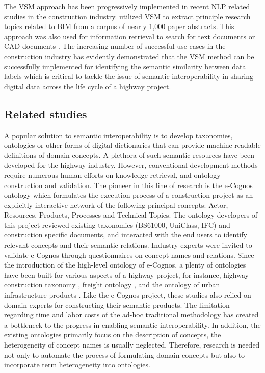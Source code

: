\documentclass[Journal, BackFigs,NoLists, DoubleSpace]{ascelike}%
\begin{document}
\par
The VSM approach has been progressively implemented in recent NLP related studies in the construction industry.  utilized VSM to extract principle research topics related to BIM from a corpus of nearly 1,000 paper abstracts. This approach was also used for information retrieval to search for text documents \cite{lv15} or CAD documents \cite{hsu13}. The increasing number of successful use cases in the construction industry has evidently demonstrated that the VSM method can be successfully implemented for identifying the semantic similarity between data labels which is critical to tackle the issue of semantic interoperability in sharing digital data across the life cycle of a highway project.
%
\subsection{Related studies}
% 
A popular solution to semantic interoperability is to develop taxonomies, ontologies or other forms of digital dictionaries that can provide machine-readable definitions of domain concepts. A plethora of such semantic resources have been developed for the highway industry. However, conventional development methods require numerous human efforts on knowledge retrieval, and ontology construction and validation. The pioneer in this line of research is the e-Cognos ontology \cite{wetherill02,lima05} which formulates the execution process of a construction project as an explicitly interactive network of the following principal concepts: Actor, Resources, Products, Processes and Technical Topics. The ontology developers of this project reviewed existing taxonomies (BS61000, UniClass, IFC) and construction specific documents, and interacted with the end users to identify relevant concepts and their semantic relations. Industry experts were invited to validate e-Cognos through questionnaires on concept names and relations. Since the introduction of the high-level ontology of e-Cognos, a plenty of ontologies have been built for various aspects of a highway project, for instance, highway construction taxonomy \cite{el-diraby05,el-diraby05b}, freight ontology \cite{seedah15}, and the ontology of urban infrastructure products \cite{osman06}. Like the e-Cognos project, these studies also relied on domain experts for constructing their semantic products. The limitation regarding time and labor costs of the ad-hoc traditional methodology has created a bottleneck to the progress in enabling semantic interoperability. In addition, the existing ontologies primarily focus on the description of concepts, the heterogeneity of concept names is usually neglected. Therefore, research is needed not only to automate the process of formulating domain concepts but also to incorporate term heterogeneity into ontologies.
\end{document}
